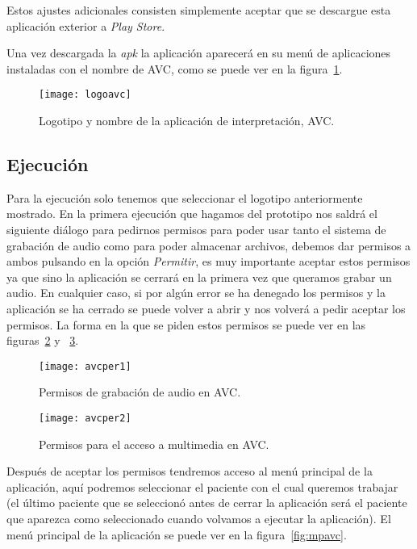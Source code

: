 Estos ajustes adicionales consisten simplemente aceptar que se descargue esta aplicación exterior a \textit{Play Store}.

Una vez descargada la \textit{apk} la aplicación aparecerá en su menú de aplicaciones instaladas con el nombre de AVC, como se puede ver en la figura~\ref{fig:logoavc}.

\begin{figure}[htp]
	\centering
	\texttt{[image: logoavc]}
	\caption{Logotipo y nombre de la aplicación de interpretación, AVC.}
	\label{fig:logoavc}
\end{figure}

\subsection{Ejecución}
Para la ejecución solo tenemos que seleccionar el logotipo anteriormente mostrado. En la primera ejecución que hagamos del prototipo nos saldrá el siguiente diálogo para pedirnos permisos para poder usar tanto el sistema de grabación de audio como para poder almacenar archivos, debemos dar permisos a ambos pulsando en la opción \textit{Permitir}, es muy importante aceptar estos permisos ya que sino la aplicación se cerrará en la primera vez que queramos grabar un audio. En cualquier caso, si por algún error se ha denegado los permisos y la aplicación se ha cerrado se puede volver a abrir y nos volverá a pedir aceptar los permisos. La forma en la que se piden estos permisos se puede ver en las figuras~\ref{fig:avcper1} y ~\ref{fig:avcper2}.

\begin{figure}[htp]
	\centering
	\texttt{[image: avcper1]}
	\caption{Permisos de grabación de audio en AVC.}
	\label{fig:avcper1}
\end{figure}

\begin{figure}[htp]
	\centering
	\texttt{[image: avcper2]}
	\caption{Permisos para el acceso a multimedia en AVC.}
	\label{fig:avcper2}
\end{figure}

Después de aceptar los permisos tendremos acceso al menú principal de la aplicación, aquí podremos seleccionar el paciente con el cual queremos trabajar (el último paciente que se seleccionó antes de cerrar la aplicación será el paciente que aparezca como seleccionado cuando volvamos a ejecutar la aplicación). El menú principal de la aplicación se puede ver en la figura~\ref{fig:mpavc}.

